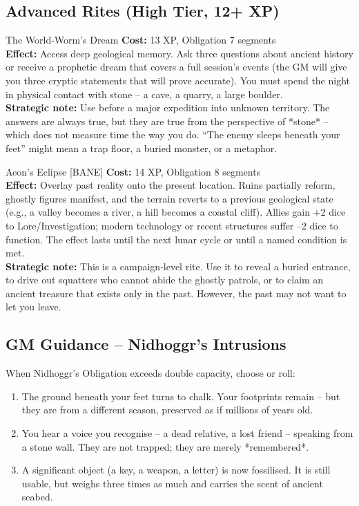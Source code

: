 \documentclass[10pt,a5paper]{book}
\begin{document}
\subsection*{Advanced Rites (High Tier, 12+ XP)}

\begin{patronbox}{The World‑Worm’s Dream}
\textbf{Cost:} 13 XP, Obligation 7 segments \\
\textbf{Effect:} Access deep geological memory. Ask three questions about ancient history or receive a prophetic dream that covers a full session’s events (the GM will give you three cryptic statements that will prove accurate). You must spend the night in physical contact with stone – a cave, a quarry, a large boulder. \\
\textbf{Strategic note:} Use before a major expedition into unknown territory. The answers are always true, but they are true from the perspective of *stone* – which does not measure time the way you do. “The enemy sleeps beneath your feet” might mean a trap floor, a buried monster, or a metaphor.
\end{patronbox}

\begin{patronbox}{Aeon’s Eclipse [BANE]}
\textbf{Cost:} 14 XP, Obligation 8 segments \\
\textbf{Effect:} Overlay past reality onto the present location. Ruins partially reform, ghostly figures manifest, and the terrain reverts to a previous geological state (e.g., a valley becomes a river, a hill becomes a coastal cliff). Allies gain +2 dice to Lore/Investigation; modern technology or recent structures suffer –2 dice to function. The effect lasts until the next lunar cycle or until a named condition is met. \\
\textbf{Strategic note:} This is a campaign‑level rite. Use it to reveal a buried entrance, to drive out squatters who cannot abide the ghostly patrols, or to claim an ancient treasure that exists only in the past. However, the past may not want to let you leave.
\end{patronbox}

\subsection*{GM Guidance – Nidhoggr’s Intrusions}

When Nidhoggr’s Obligation exceeds double capacity, choose or roll:
\begin{enumerate}
    \item The ground beneath your feet turns to chalk. Your footprints remain – but they are from a different season, preserved as if millions of years old.
    \item You hear a voice you recognise – a dead relative, a lost friend – speaking from a stone wall. They are not trapped; they are merely *remembered*.
    \item A significant object (a key, a weapon, a letter) is now fossilised. It is still usable, but weighs three times as much and carries the scent of ancient seabed.
\end{enumerate}
\end{document}
